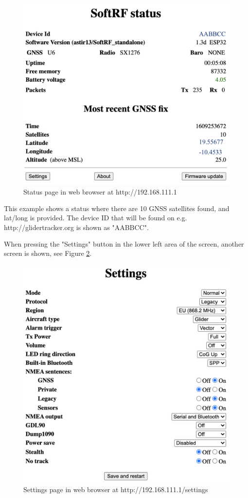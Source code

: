 \documentclass[11pt,a4paper]{article}
\begin{document}
\begin{figure}[h]
\centering
\includegraphics[scale=.6]{status.png}
\caption{Status page in web browser at http://192.168.111.1}\label{status}
\end{figure}\FloatBarrier

This example shows a status where there are 10 GNSS satellites found, and lat/long is provided. The device ID that will be found on e.g. http://glidertracker.org is shown as "AABBCC".

When pressing the "Settings" button in the lower left area of the screen, another screen is shown, see Figure \ref{settings}.

\begin{figure}[h]
\centering
\includegraphics[scale=.6]{settings.png}
\caption{Settings page in web browser at http://192.168.111.1/settings}\label{settings}
\end{figure}\FloatBarrier
\end{document}

